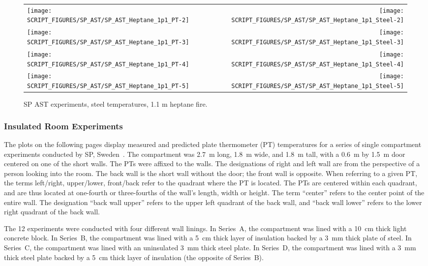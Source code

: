 \begin{figure}[p]
\begin{tabular*}{\textwidth}{l@{\extracolsep{\fill}}r}
\texttt{[image: SCRIPT\_FIGURES/SP\_AST/SP\_AST\_Heptane\_1p1\_PT-2]} &  \texttt{[image: SCRIPT\_FIGURES/SP\_AST/SP\_AST\_Heptane\_1p1\_Steel-2]}  \\
\texttt{[image: SCRIPT\_FIGURES/SP\_AST/SP\_AST\_Heptane\_1p1\_PT-3]} &  \texttt{[image: SCRIPT\_FIGURES/SP\_AST/SP\_AST\_Heptane\_1p1\_Steel-3]}  \\
\texttt{[image: SCRIPT\_FIGURES/SP\_AST/SP\_AST\_Heptane\_1p1\_PT-4]} &  \texttt{[image: SCRIPT\_FIGURES/SP\_AST/SP\_AST\_Heptane\_1p1\_Steel-4]}  \\
\texttt{[image: SCRIPT\_FIGURES/SP\_AST/SP\_AST\_Heptane\_1p1\_PT-5]} &  \texttt{[image: SCRIPT\_FIGURES/SP\_AST/SP\_AST\_Heptane\_1p1\_Steel-5]}
\end{tabular*}
\caption{SP AST experiments, steel temperatures, 1.1 m heptane fire.}
\label{SP_Heptane_1p1_PT_Steel}
\end{figure}

\clearpage

\subsubsection{Insulated Room Experiments}

The plots on the following pages display measured and predicted plate thermometer (PT) temperatures for a series of single compartment experiments conducted by SP, Sweden~\cite{Sjostrom:SP2016}. The compartment was 2.7~m long, 1.8~m wide, and 1.8~m tall, with a 0.6~m by 1.5~m door centered on one of the short walls. The PTs were affixed to the walls. The designations of right and left wall are from the perspective of a person looking into the room. The back wall is the short wall without the door; the front wall is opposite. When referring to a given PT, the terms left/right, upper/lower, front/back refer to the quadrant where the PT is located. The PTs are centered within each quadrant, and are thus located at one-fourth or three-fourths of the wall's length, width or height. The term ``center'' refers to the center point of the entire wall. The designation ``back wall upper'' refers to the upper left quadrant of the back wall, and ``back wall lower'' refers to the lower right quadrant of the back wall.

The 12 experiments were conducted with four different wall linings. In Series~A, the compartment was lined with a 10~cm thick light concrete block. In Series~B, the compartment was lined with a 5~cm thick layer of insulation backed by a 3~mm thick plate of steel. In Series~C, the compartment was lined with an uninsulated 3~mm thick steel plate. In Series~D, the compartment was lined with a 3~mm thick steel plate backed by a 5~cm thick layer of insulation (the opposite of Series~B).

